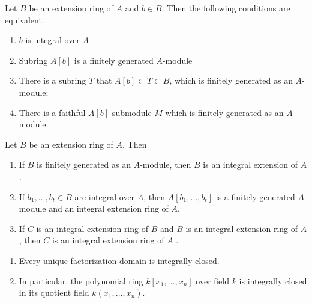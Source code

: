 \documentclass[12pt, oneside]{book}
\begin{document}
\begin{theorem}
    \label{thm: integral}
    Let $B$ be an extension ring of $A$ and $b \in B$. Then the following conditions are equivalent.
    \begin{enumerate}
        \item
              $b$ is integral over $A$
        \item
              Subring $A[b]$ is a finitely generated $A$-module
        \item
              There is a subring $T$ that $A[b]\subset T\subset B$, which is finitely generated as an $A$-module;
        \item
              There is a faithful $A[b]$-submodule $M$ which is finitely generated as an $A$-module.
    \end{enumerate}
\end{theorem}


\begin{corollary}
    \label{cor: integral extensions}
    Let $B$ be an extension ring of $A$. Then
    \begin{enumerate}
        \item
              If $B$ is finitely generated as an $A$-module, then $B$ is an integral extension of $A$.
        \item
              If $b_1, \ldots, b_{t} \in B$ are integral over $A$, then $A\left[b_1, \ldots, b_{t}\right]$ is a finitely generated $A$-module and an integral extension ring of $A$.
        \item
              If $C$ is an integral extension ring of $B$ and $B$ is an integral extension ring of $A$, then $C$ is an integral extension ring of $A$ .
    \end{enumerate}
\end{corollary}




\begin{proposition}
    \begin{enumerate}
        \item
              Every unique factorization domain is integrally closed.
        \item
              In particular, the polynomial ring $k\left[x_1, \ldots, x_n\right]$ over field $k$ is integrally closed in its quotient field $k\left(x_1, \ldots, x_n\right)$.
    \end{enumerate}
\end{proposition}
\end{document}
